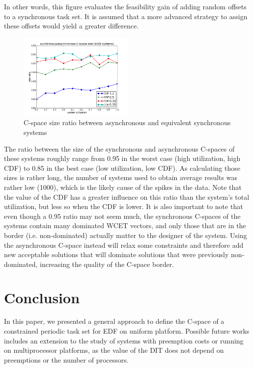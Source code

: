 \documentclass[conference]{IEEEtran}
\begin{document}
	In other words, this figure
	evaluates the feasibility gain of adding random offsets to a synchronous task
	set. It is assumed that a more advanced strategy to assign these offsets
	would yield a greater difference.

	\begin{figure}[h]
		\begin{center}
			\includegraphics[width=0.5\textwidth]{figs/sizeratio.png}
			\caption{C-space size ratio between asynchronous and equivalent synchronous
			systems}
			\label{fig:sizeRatio}
		\end{center}
	\end{figure}

	The ratio between the size of the synchronous and asynchronous C-spaces of
	these systems roughly range from 0.95 in the worst case (high utilization, high
	CDF) to 0.85 in the best case (low utilization, low CDF). As calculating those
	sizes is rather long, the number of systems used to obtain average
	results was rather low (1000), which is the likely cause of the spikes in the
	data. Note that the value of the CDF has a greater influence on this ratio than
	the system's total utilization, but less so when the CDF is lower. It is also
	important to note that even though a 0.95 ratio may not seem much, the
	synchronous C-spaces of the systems contain many dominated WCET vectors, and
	only those that are in the border (i.e. non-dominated) actually matter to the
	designer of the system. Using the asynchronous C-space instead will relax some
	constraints and therefore add new acceptable solutions that will dominate solutions that were previously non-dominated,
	increasing the quality of the C-space border.


\section{Conclusion}

In this paper, we presented a general approach to define the C-space of a constrained periodic task set for EDF on uniform platform. Possible future works includes an extension to the study of systems with preemption costs or running on multiprocessor platforms, as the value of the DIT does not depend on preemptions or the number of processors.
\end{document}
